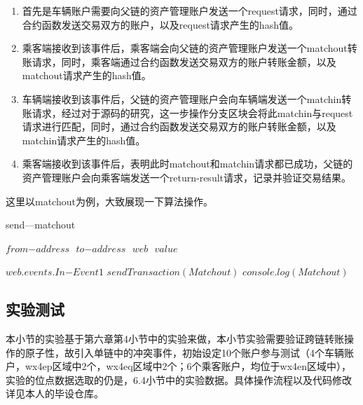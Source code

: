 \begin{enumerate}
    \item 首先是车辆账户需要向父链的资产管理账户发送一个request请求，同时，通过合约函数发送交易双方的账户，以及request请求产生的hash值。
    \item 乘客端接收到该事件后，乘客端会向父链的资产管理账户发送一个matchout转账请求，同时，乘客端通过合约函数发送交易双方的账户转账金额，以及matchout请求产生的hash值。
    \item 车辆端接收到该事件后，父链的资产管理账户会向车辆端发送一个matchin转账请求，经过对于源码的研究，这一步操作分支区块会将此matchin与request请求进行匹配，同时，通过合约函数发送交易双方的账户转账金额，以及matchin请求产生的hash值。
    \item 乘客端接收到该事件后，表明此时matchout和matchin请求都已成功，父链的资产管理账户会向乘客端发送一个return-result请求，记录并验证交易结果。
\end{enumerate}

这里以matchout为例，大致展现一下算法操作。


\renewcommand{\algorithmicrequire}{\textbf{输入：}\unskip}
\renewcommand{\algorithmicensure}{\textbf{输出：}\unskip}

\begin{algorithm}
  \linespread{1.5}
  \caption{send—matchout}
  \label{alg1}
  \small
  \begin{algorithmic}
    \REQUIRE $from$$-$$address$ $ $
    $to$$-$$address$  $ $
    $web$  $ $
    $value$ 

    \STATE $web.events.In$$-$$Event1$
            \STATE $sendTransaction(Matchout)$
            \STATE $console.log(Matchout)$
        \ENDIF
      
  \end{algorithmic}
\end{algorithm}

\subsection{实验测试}

本小节的实验基于第六章第4小节中的实验来做，本小节实验需要验证跨链转账操作的原子性，故引入单链中的冲突事件，初始设定10个账户参与测试（4个车辆账户，wx4ep区域中2个，wx4eq区域中2个；6个乘客账户，均位于wx4en区域中），实验的位点数据选取的仍是，6.4小节中的实验数据。具体操作流程以及代码修改详见本人的毕设仓库。

